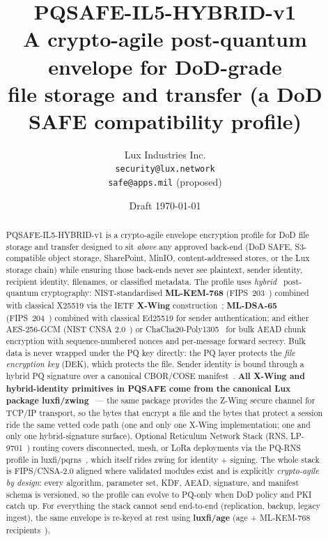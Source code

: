 \documentclass[11pt,a4paper]{article}
\title{\textbf{PQSAFE-IL5-HYBRID-v1}\\
       \large A crypto-agile post-quantum envelope for DoD-grade\\
       file storage and transfer (a DoD SAFE compatibility profile)}
\author{Lux Industries Inc.\\
        \texttt{security@lux.network}\\
        \texttt{safe@apps.mil} (proposed)}
\date{Draft \today}
\begin{document}
\luxcoverpage
\maketitle

\begin{abstract}
PQSAFE-IL5-HYBRID-v1 is a crypto-agile envelope encryption profile for
DoD file storage and transfer designed to sit \emph{above} any approved
back-end (DoD SAFE, S3-compatible object storage, SharePoint, MinIO,
content-addressed stores, or the Lux storage chain) while ensuring those
back-ends never see plaintext, sender identity, recipient identity,
filenames, or classified metadata. The profile uses
\emph{hybrid}~\cite{xwing2024} post-quantum cryptography:
NIST-standardised
\textbf{ML-KEM-768} (FIPS~203~\cite{fips203}) combined with
classical X25519 via the IETF \textbf{X-Wing} construction~\cite{xwing2024};
\textbf{ML-DSA-65} (FIPS~204~\cite{fips204}) combined with classical
Ed25519 for sender authentication; and either AES-256-GCM (NIST CNSA
2.0~\cite{cnsa2}) or ChaCha20-Poly1305~\cite{rfc8439} for bulk AEAD chunk
encryption with sequence-numbered nonces and per-message forward
secrecy. Bulk data is never wrapped under the PQ key directly: the PQ
layer protects the \emph{file encryption key} (DEK), which protects the
file. Sender identity is bound through a hybrid PQ signature over a
canonical CBOR/COSE manifest~\cite{rfc8949,rfc8152}. \textbf{All X-Wing
and hybrid-identity primitives in PQSAFE come from the canonical Lux
package luxfi/zwing}~\cite{luxzwing} --- the same package provides the
Z-Wing secure channel for TCP/IP transport, so the bytes that encrypt
a file and the bytes that protect a session ride the same vetted
code path (one and only one X-Wing implementation; one and only one
hybrid-signature surface). Optional Reticulum Network Stack
(RNS, LP-9701~\cite{lp9701}) routing covers disconnected, mesh, or
LoRa deployments via the PQ-RNS profile in luxfi/pqrns~\cite{pqrns},
which itself rides zwing for identity + signing. The whole stack is FIPS/CNSA-2.0
aligned where validated modules exist and is explicitly \emph{crypto-agile
by design}: every algorithm, parameter set, KDF, AEAD, signature, and
manifest schema is versioned, so the profile can evolve to PQ-only when
DoD policy and PKI catch up. For everything the stack cannot send
end-to-end (replication, backup, legacy ingest), the same envelope is
re-keyed at rest using \textbf{luxfi/age} (age + ML-KEM-768
recipients~\cite{luxage}).
\end{abstract}
\end{document}
